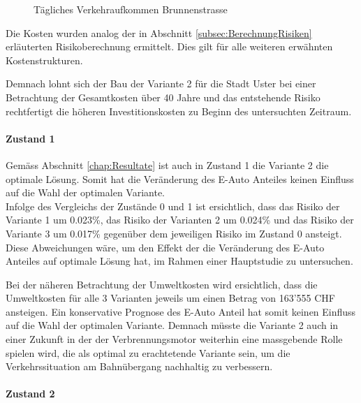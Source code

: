 \begin{figure}[h!]
  \centering
  \hfill
\caption[Verkehrsaufkommen]{Tägliches Verkehraufkommen Brunnenstrasse}
  \label{img:KostenZ0}
\end{figure}

\begin{IMleftrightskip}
Die Kosten wurden analog der in Abschnitt \ref{subsec:BerechnungRisiken} erläuterten Risikoberechnung ermittelt. Dies gilt für alle weiteren erwähnten Kostenstrukturen.
\end{IMleftrightskip}

Demnach lohnt sich der Bau der Variante 2 für die Stadt Uster bei einer Betrachtung der Gesamtkosten über 40 Jahre und das entstehende Risiko rechtfertigt die höheren Investitionskosten zu Beginn des untersuchten Zeitraum. 

\paragraph{Zustand 1}

Gemäss Abschnitt \ref{chap:Resultate} ist auch in Zustand 1 die Variante 2 die optimale Lösung. Somit hat die Veränderung des E-Auto Anteiles keinen Einfluss auf die Wahl der optimalen Variante. \\
Infolge des Vergleichs der Zustände 0 und 1 ist ersichtlich, dass das Risiko der Variante 1 um 0.023\%, das Risiko der Varianten 2 um 0.024\% und das Risiko der Variante 3 um 0.017\% gegenüber dem jeweiligen Risiko im Zustand 0 ansteigt. Diese Abweichungen wäre, um den Effekt der die Veränderung des E-Auto Anteiles auf optimale Lösung hat, im Rahmen einer Hauptstudie zu untersuchen.

Bei der näheren Betrachtung der Umweltkosten wird ersichtlich, dass die Umweltkosten für alle 3 Varianten jeweils um einen Betrag von 163'555 CHF ansteigen. 
Ein konservative Prognose des E-Auto Anteil hat somit keinen Einfluss auf die Wahl der optimalen Variante. Demnach müsste die Variante 2 auch in einer Zukunft in der der Verbrennungsmotor weiterhin eine massgebende Rolle spielen wird, die als optimal zu erachtetende Variante sein, um die Verkehrssituation am Bahnübergang nachhaltig zu verbessern.


\paragraph{Zustand 2} 

